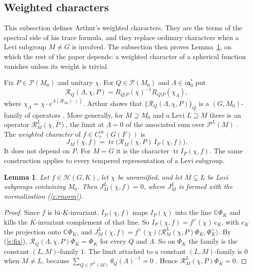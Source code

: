 \documentclass[12pt,letterpaper]{article}
\numberwithin{equation}{section}
\theoremstyle{plain}
\newtheorem{lemma}[theorem]{Lemma}
\theoremstyle{definition}
\theoremstyle{remark}
\newcommand{\Hc}{\mathcal{H}}
\newcommand{\cP}{\mathcal{P}}
\newcommand{\fa}{\mathfrak{a}}
\newcommand{\ip}[1]{\langle #1\rangle}
\DeclareMathOperator{\tr}{tr}
\begin{document}
\subsection{Weighted characters}\label{s:wchar}

This subsection defines Arthur's weighted characters. They are the terms of the spectral side of his trace formula, and they replace ordinary characters when a Levi subgroup $M\ne G$ is involved. The subsection then proves Lemma~\ref{l:sphvanish}, on which the rest of the paper depends: a weighted character of a spherical function vanishes unless its weight is trivial.

Fix $P\in\cP(M_0)$ and unitary $\chi$. For $Q\in\cP(M_0)$ and $\Lambda\in i\fa_0^*$ put
\[
\mathcal R_Q(\Lambda,\chi,P)=R_{Q|P}(\chi)^{-1}R_{Q|P}(\chi_\Lambda),
\]
where $\chi_\Lambda=\chi\cdot e^{\Lambda(H_{M_0}(\cdot))}$. Arthur shows that $\{\mathcal R_Q(\Lambda,\chi,P)\}_Q$ is a $(G,M_0)$-family of operators \cite[\S7]{Ar81}. More generally, for $M\supseteq M_0$ and a Levi $L\supseteq M$ there is an operator $\mathcal R^L_M(\chi,P)$, the limit at $\Lambda=0$ of the associated sum over $\cP^L(M)$ \cite[\S6]{Ar81}. The \emph{weighted character} of $f\in C_c^\infty(G(F))$ is
\[
J_M(\chi,f)=\tr\big(\mathcal R_M(\chi,P)\,I_P(\chi,f)\big).
\]
It does not depend on $P$. For $M=G$ it is the character $\tr I_P(\chi,f)$. The same construction applies to every tempered representation of a Levi subgroup.

\begin{lemma}\label{l:sphvanish}
Let $f\in\Hc(G,K)$, let $\chi$ be unramified, and let $M\subsetneq L$ be Levi subgroups containing $M_0$. Then $J^L_M(\chi,f)=0$, where $J^L_M$ is formed with the normalization (\ref{e:rnorm}).
\end{lemma}

\begin{proof}
Since $f$ is bi-$K$-invariant, $I_P(\chi,f)$ maps $I_P(\chi)$ into the line $\mathbb{C}\Phi_K$ and kills the $K$-invariant complement of that line. So $I_P(\chi,f)=f^\vee(\chi)\,e_K$, with $e_K$ the projection onto $\mathbb{C}\Phi_K$, and $J^L_M(\chi,f)=f^\vee(\chi)\ip{\mathcal R^L_M(\chi,P)\Phi_K,\Phi_K^\vee}$. By (\ref{e:fix}), $\mathcal R_Q(\Lambda,\chi,P)\Phi_K=\Phi_K$ for every $Q$ and $\Lambda$. So on $\Phi_K$ the family is the constant $(L,M)$-family $1$. The limit attached to a constant $(L,M)$-family is $0$ when $M\ne L$, because $\sum_{Q\in\cP^L(M)}\theta_Q(\Lambda)^{-1}=0$ \cite[Lemma~6.2]{Ar81}. Hence $\mathcal R^L_M(\chi,P)\Phi_K=0$.
\end{proof}
\end{document}
